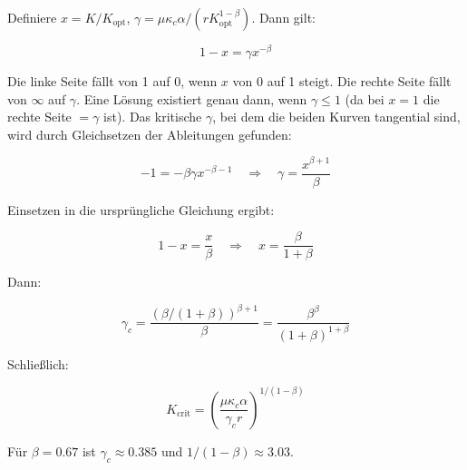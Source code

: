 \documentclass[12pt,a4paper]{article}
\theoremstyle{remark}
\newcommand{\kappac}{\kappa_c}
\begin{document}
	Definiere $x = K/K_{\text{opt}}$, $\gamma = \mu \kappac \alpha / (r K_{\text{opt}}^{1-\beta})$. Dann gilt:
	
	\begin{equation}
		1 - x = \gamma x^{-\beta}
		\label{eq:x-eqn}
	\end{equation}
	
	Die linke Seite fällt von 1 auf 0, wenn $x$ von 0 auf 1 steigt. Die rechte Seite fällt von $\infty$ auf $\gamma$. Eine Lösung existiert genau dann, wenn $\gamma \leq 1$ (da bei $x=1$ die rechte Seite $=\gamma$ ist). Das kritische $\gamma$, bei dem die beiden Kurven tangential sind, wird durch Gleichsetzen der Ableitungen gefunden:
	
	\begin{equation}
		-1 = -\beta \gamma x^{-\beta-1} \quad \Rightarrow \quad \gamma = \frac{x^{\beta+1}}{\beta}
		\label{eq:derivative}
	\end{equation}
	
	Einsetzen in die ursprüngliche Gleichung ergibt:
	
	\begin{equation}
		1 - x = \frac{x}{\beta} \quad \Rightarrow \quad x = \frac{\beta}{1+\beta}
		\label{eq:x-crit}
	\end{equation}
	
	Dann:
	
	\begin{equation}
		\gamma_c = \frac{(\beta/(1+\beta))^{\beta+1}}{\beta} = \frac{\beta^{\beta}}{(1+\beta)^{1+\beta}}
		\label{eq:gamma-c-app}
	\end{equation}
	
	Schließlich:
	
	\begin{equation}
		K_{\text{crit}} = \left( \frac{\mu \kappac \alpha}{\gamma_c r} \right)^{1/(1-\beta)}
		\label{eq:Kcrit-app}
	\end{equation}
	
	Für $\beta = 0.67$ ist $\gamma_c \approx 0.385$ und $1/(1-\beta) \approx 3.03$.
	
\end{document}

